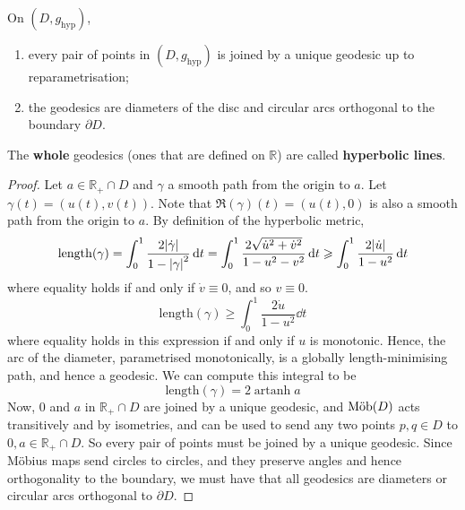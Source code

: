 \documentclass[a4paper]{article}
\begin{document}
\begin{lemma}
	On \( (D, g_{\text{hyp}}) \),
	\begin{enumerate}
		\item every pair of points in \( (D, g_{\text{hyp}}) \) is joined by a unique geodesic up to reparametrisation;
		\item the geodesics are diameters of the disc and circular arcs orthogonal to the boundary \( \partial D \).
	\end{enumerate}
	The \textbf{whole} geodesics (ones that are defined on \( \mathbb R \)) are called \textbf{hyperbolic lines}.
\end{lemma}
\begin{proof}
	Let \( a \in \mathbb R_+ \cap D \) and \( \gamma \) a smooth path from the origin to \( a \).
	Let \( \gamma(t) = (u(t),v(t)) \).
	Note that \( \Re(\gamma)(t) = (u(t),0) \) is also a smooth path from the origin to \( a \).
	By definition of the hyperbolic metric,
	\[
		\mathrm{length}(\gamma) = \int_0^1 \frac{2\abs{\dot \gamma}}{1 - \abs{\gamma}^2} \dd{t} = \int_0^1 \frac{2\sqrt{\dot u^2 + \dot v^2}}{1-u^2 - v^2} \dd{t} \geqslant \int_0^1 \frac{2 \abs{\dot u}}{1-u^2} \dd{t}
	\]
	where equality holds if and only if \( \dot v \equiv 0 \), and so \( v \equiv 0 \).
	\[
		\mathrm{length}(\gamma) \geq \int_0^1 \frac{2 \dot u}{1-u^2} \dd{t}
	\]
	where equality holds in this expression if and only if \( u \) is monotonic.
	Hence, the arc of the diameter, parametrised monotonically, is a globally length-minimising path, and hence a geodesic.
	We can compute this integral to be
	\[
		\mathrm{length}(\gamma) = 2 \operatorname{artanh} a
	\]
	Now, \( 0 \) and \( a \) in \( \mathbb R_+ \cap D \) are joined by a unique geodesic, and \( \text{M\"ob}(D) \) acts transitively and by isometries, and can be used to send any two points \( p,q \in D \) to \( 0,a \in \mathbb R_+ \cap D \).
	So every pair of points must be joined by a unique geodesic.
	Since M\"obius maps send circles to circles, and they preserve angles and hence orthogonality to the boundary, we must have that all geodesics are diameters or circular arcs orthogonal to \( \partial D \).
\end{proof}
\end{document}
